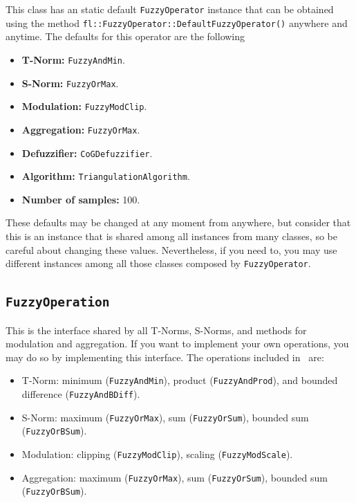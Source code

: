 			This class has an static default \texttt{FuzzyOperator} instance that can be obtained using the method \texttt{fl::FuzzyOperator::DefaultFuzzyOperator()} anywhere and anytime. The defaults for this operator are the following

			\begin{multicols}{2}
			\begin{itemize}[nolistsep]
				\item \textbf{T-Norm:} \texttt{FuzzyAndMin}.
				\item \textbf{S-Norm:} \texttt{FuzzyOrMax}.
				\item \textbf{Modulation:} \texttt{FuzzyModClip}.
				\item \textbf{Aggregation:} \texttt{FuzzyOrMax}.
				\item \textbf{Defuzzifier:} \texttt{CoGDefuzzifier}.
				\item \textbf{Algorithm:} \texttt{TriangulationAlgorithm}.
				\item \textbf{Number of samples:} 100.
			\end{itemize}
			\end{multicols}
	
	These defaults may be changed at any moment from anywhere, but consider that this is an instance that is shared among all instances from many classes, so be careful about changing these values. Nevertheless, if you need to, you may use different instances among all those classes composed by \texttt{FuzzyOperator}. 
	
	\subsection{\texttt{FuzzyOperation}}
		This is the interface shared by all T-Norms, S-Norms, and methods for modulation and aggregation. If you want to implement your own operations, you may do so by implementing  this interface. The operations included in \fl\ are:
		
		\begin{itemize}
			\item T-Norm: minimum (\texttt{FuzzyAndMin}), product (\texttt{FuzzyAndProd}), and bounded difference (\texttt{FuzzyAndBDiff}).
			\item S-Norm: maximum (\texttt{FuzzyOrMax}), sum (\texttt{FuzzyOrSum}), bounded sum (\texttt{FuzzyOrBSum}).
			\item Modulation: clipping (\texttt{FuzzyModClip}), scaling (\texttt{FuzzyModScale}).
			\item Aggregation: maximum (\texttt{FuzzyOrMax}), sum (\texttt{FuzzyOrSum}), bounded sum (\texttt{FuzzyOrBSum}).
		\end{itemize}
		

